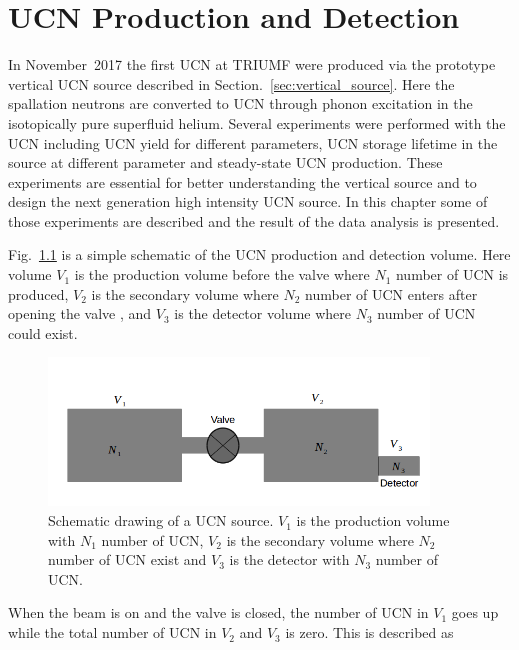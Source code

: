 \chapter{UCN Production and Detection\label{chap:UCNresult}}

In November~2017 the first UCN at TRIUMF were produced via the
prototype vertical UCN source described in
Section.~\ref{sec:vertical_source}. Here the spallation neutrons are
converted to UCN through phonon excitation in the isotopically pure
superfluid helium. Several experiments were performed with the UCN
including UCN yield for different parameters, UCN storage lifetime in
the source at different parameter and steady-state UCN
production. These experiments are essential for better understanding
the vertical source and to design the next generation high intensity
UCN source. In this chapter some of those experiments are described
and the result of the data analysis is presented.

Fig.~\ref{fig:volume_schematic} is a simple schematic of the UCN
production and detection volume.  Here volume $V_1$ is the production
volume before the valve where $N_1$ number of UCN is produced, $V_2$
is the secondary volume where $N_2$ number of UCN enters after opening
the valve , and $V_3$ is the detector volume where $N_3$ number of UCN
could exist.



\begin{figure}[h]
  \centering
  \includegraphics[width=0.9\textwidth]{volume_schematic.png}
  \caption{Schematic drawing of a UCN source. $V_1$ is the production
    volume with $N_1$ number of UCN, $V_2$ is the secondary volume
    where $N_2$ number of UCN exist and $V_3$ is the detector with
    $N_3$ number of UCN. }
  \label{fig:volume_schematic}
\end{figure}

When the beam is on and the valve is closed, the number of UCN in
$V_1$ goes up while the total number of UCN in $V_2$ and $V_3$ is
zero. This is described as 

